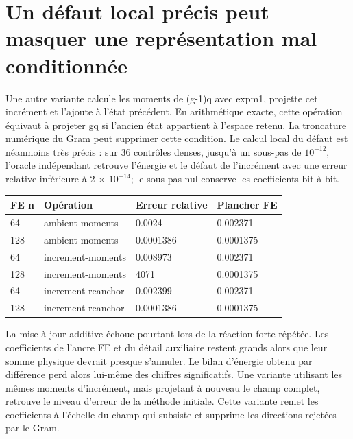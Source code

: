 \documentclass[10pt,a4paper]{article}
\begin{document}
\section{Un défaut local précis peut masquer une représentation mal conditionnée}
Une autre variante calcule les moments de (g-1)q avec expm1, projette cet incrément et l'ajoute à l'état précédent. En arithmétique exacte, cette opération équivaut à projeter gq si l'ancien état appartient à l'espace retenu. La troncature numérique du Gram peut supprimer cette condition. Le calcul local du défaut est néanmoins très précis : sur 36 contrôles denses, jusqu'à un sous-pas de \(10^{-12}\), l'oracle indépendant retrouve l'énergie et le défaut de l'incrément avec une erreur relative inférieure à 2 \(\times\) \(10^{-14}\); le sous-pas nul conserve les coefficients bit à bit.

\begin{center}\small\begin{tabular}{llll}\toprule
FE n & Opération & Erreur relative & Plancher FE\\\midrule
64 & ambient-moments & 0.0024 & 0.002371\\
128 & ambient-moments & 0.0001386 & 0.0001375\\
64 & increment-moments & 0.008973 & 0.002371\\
128 & increment-moments & 4071 & 0.0001375\\
64 & increment-reanchor & 0.002399 & 0.002371\\
128 & increment-reanchor & 0.0001386 & 0.0001375\\
\bottomrule\end{tabular}\end{center}
La mise à jour additive échoue pourtant lors de la réaction forte répétée. Les coefficients de l'ancre FE et du détail auxiliaire restent grands alors que leur somme physique devrait presque s'annuler. Le bilan d'énergie obtenu par différence perd alors lui-même des chiffres significatifs. Une variante utilisant les mêmes moments d'incrément, mais projetant à nouveau le champ complet, retrouve le niveau d'erreur de la méthode initiale. Cette variante remet les coefficients à l'échelle du champ qui subsiste et supprime les directions rejetées par le Gram.
\end{document}
